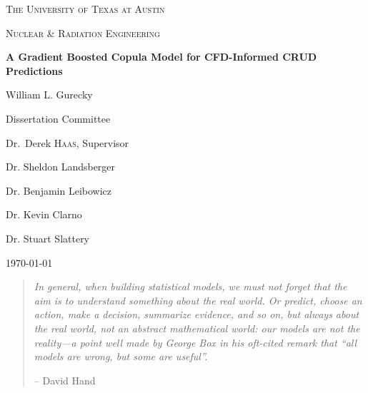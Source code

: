 
\begin{titlepage}
	\centering
	{\scshape\LARGE The University of Texas at Austin \par}
	\vspace{1cm}
	{\scshape\Large Nuclear \& Radiation Engineering \par}
	\vspace{1.5cm}
	{\huge\bfseries A Gradient Boosted Copula Model for CFD-Informed CRUD Predictions \par}
	\vspace{2cm}
	{\Large William L. Gurecky \par}
	\vfill

	\begin{flushright}
	Dissertation Committee \par
	\bigskip
	Dr.~Derek \textsc{Haas}, Supervisor \par
	Dr. Sheldon Landsberger \par
	Dr. Benjamin Leibowicz \par
	Dr. Kevin Clarno \par
	Dr. Stuart Slattery \par
	\end{flushright}
	\vfill
	{\large \today\par}
\end{titlepage}
\pagebreak
\tableofcontents
\pagebreak

\clearpage
\vspace*{\fill}
\thispagestyle{empty} %
\begin{quotation}
\em %
In general, when building statistical models, we must not forget that the aim is to understand something about the real world. Or predict, choose an action, make a decision, summarize evidence, and so on, but always about the real world, not an abstract mathematical world: our models are not the reality—a point well made by George Box in his oft-cited remark that “all models are wrong, but some are useful”.
\medskip

--  David Hand
\end{quotation}
\vspace*{\fill}

\pagebreak
